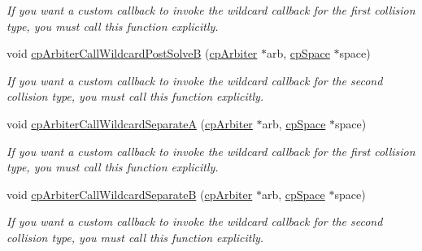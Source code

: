 \begin{DoxyCompactItemize}
\begin{DoxyCompactList}\small\item\em If you want a custom callback to invoke the wildcard callback for the first collision type, you must call this function explicitly. \end{DoxyCompactList}\item 
\hypertarget{group__cp_arbiter_ga952aae395b21de90fc82386cd08e0052}{}void \hyperlink{group__cp_arbiter_ga952aae395b21de90fc82386cd08e0052}{cp\+Arbiter\+Call\+Wildcard\+Post\+Solve\+B} (\hyperlink{structcp_arbiter}{cp\+Arbiter} $\ast$arb, \hyperlink{structcp_space}{cp\+Space} $\ast$space)\label{group__cp_arbiter_ga952aae395b21de90fc82386cd08e0052}

\begin{DoxyCompactList}\small\item\em If you want a custom callback to invoke the wildcard callback for the second collision type, you must call this function explicitly. \end{DoxyCompactList}\item 
\hypertarget{group__cp_arbiter_ga640b99a8e1c01600e13cfa08b111dca4}{}void \hyperlink{group__cp_arbiter_ga640b99a8e1c01600e13cfa08b111dca4}{cp\+Arbiter\+Call\+Wildcard\+Separate\+A} (\hyperlink{structcp_arbiter}{cp\+Arbiter} $\ast$arb, \hyperlink{structcp_space}{cp\+Space} $\ast$space)\label{group__cp_arbiter_ga640b99a8e1c01600e13cfa08b111dca4}

\begin{DoxyCompactList}\small\item\em If you want a custom callback to invoke the wildcard callback for the first collision type, you must call this function explicitly. \end{DoxyCompactList}\item 
\hypertarget{group__cp_arbiter_gae3b1e28a44ca59f71e80ec798ce034b7}{}void \hyperlink{group__cp_arbiter_gae3b1e28a44ca59f71e80ec798ce034b7}{cp\+Arbiter\+Call\+Wildcard\+Separate\+B} (\hyperlink{structcp_arbiter}{cp\+Arbiter} $\ast$arb, \hyperlink{structcp_space}{cp\+Space} $\ast$space)\label{group__cp_arbiter_gae3b1e28a44ca59f71e80ec798ce034b7}

\begin{DoxyCompactList}\small\item\em If you want a custom callback to invoke the wildcard callback for the second collision type, you must call this function explicitly. \end{DoxyCompactList}\end{DoxyCompactItemize}


